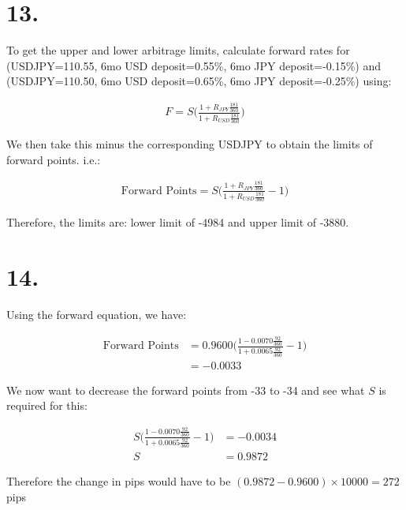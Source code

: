 \documentclass[paper=a4, fontsize=11pt]{scrartcl} %
\numberwithin{equation}{section} %
\numberwithin{figure}{section} %
\numberwithin{table}{section} %
\begin{document}
\section*{13.}

To get the upper and lower arbitrage limits, calculate forward rates for (USDJPY=110.55, 6mo USD deposit=0.55\%, 6mo JPY deposit=-0.15\%) and  (USDJPY=110.50, 6mo USD deposit=0.65\%, 6mo JPY deposit=-0.25\%) using:

\begin{align*}
F = S\Bigg(\frac{1+R_{JPY}\frac{181}{360}}{1+R_{USD}\frac{181}{360}} \Bigg)
\end{align*}

We then take this minus the corresponding USDJPY to obtain the limits of forward points. i.e.:  

\begin{align*}
\text{Forward Points} = S\Bigg(\frac{1+R_{JPY}\frac{181}{360}}{1+R_{USD}\frac{181}{360}} - 1 \Bigg)
\end{align*}

Therefore, the limits are: lower limit of -4984 and upper limit of -3880.   


\section*{14.}

Using the forward equation, we have:

\begin{align*}
\text{Forward Points} &= 0.9600 \Bigg(\frac{1-0.0070\frac{92}{360}}{1+0.0065\frac{92}{360}} - 1 \Bigg)\\
&= -0.0033
\end{align*}

We now want to decrease the forward points from -33 to -34 and see what $S$ is required for this:

\begin{align*}
S \Bigg(\frac{1-0.0070\frac{92}{360}}{1+0.0065\frac{92}{360}} - 1 \Bigg) &= -0.0034\\
S &= 0.9872
\end{align*}

Therefore the change in pips would have to be $(0.9872-0.9600)\times10000 = 272$pips

\end{document}
